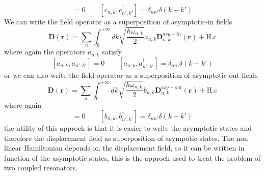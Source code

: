 \documentclass[12pt]{book}
\renewcommand{\r}{\mathbf{r}}
\begin{document}
\begin{equation}[c_{n,k},c_{n',k'}] = 0 \qquad [c_{n,k},c_{n',k'}^\dagger] = \delta_{nn'}\delta(k-k')\end{equation}
We can write the field operator as a superposition of asymptotic-in fields
\begin{equation}\label{dasyin}\mathbf{D}(\r) = \sum_n \int_{0}^{+\infty}dk \sqrt{\frac{\hbar \omega_{n,k}}{2}}a_{n,k}\mathbf{D}_{n,k}^{asy-in}(\r) + \text{H.c}\end{equation}
where again the operators $a_{n,k}$ satisfy
\begin{equation}\label{acommutator}[a_{n,k},a_{n',k'}] = 0 \qquad [a_{n,k},a_{n',k'}^\dagger] = \delta_{nn'}\delta(k-k')\end{equation}
or we can also write the field operator as a superposition of asymptotic-out fields
\begin{equation}\label{dasyout}\mathbf{D}(\r) = \sum_n \int_{0}^{+\infty}dk \sqrt{\frac{\hbar \omega_{n,k}}{2}}b_{n,k}\mathbf{D}_{n,k}^{asy-out}(\r) + \text{H.c}\end{equation}
where again
\begin{equation}[b_{n,k},b_{n',k'}] = 0 \qquad [b_{n,k},b_{n',k'}^\dagger] = \delta_{nn'}\delta(k-k')\end{equation}
the utility of this approch is that it is easier to write the asymptotic states and therefore the displacement field as superposition of asympotic states. The non linear Hamiltonian depends on the displacement field, so it can be written in function of the asymptotic states, this is the approch used to treat the problem of two coupled resonators.
\end{document}
